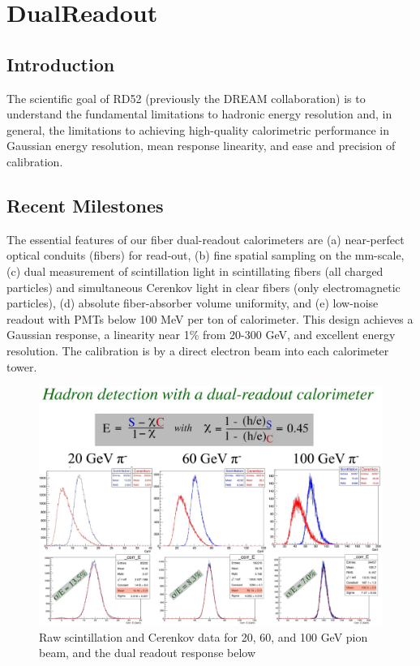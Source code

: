 \section{DualReadout}

\subsection{Introduction}
The scientific goal of RD52 (previously the DREAM collaboration) is to understand the fundamental limitations to hadronic energy resolution and, in general, the limitations to achieving high-quality calorimetric performance in Gaussian energy resolution, mean response linearity, and ease and precision of calibration.
\subsection{Recent Milestones}
The essential features of our fiber dual-readout calorimeters are (a) near-perfect optical conduits (fibers) for read-out, (b) fine spatial sampling on the mm-scale, (c) dual measurement of scintillation light in scintillating fibers (all charged particles) and simultaneous Cerenkov light in clear fibers (only electromagnetic particles), (d) absolute fiber-absorber volume uniformity, and (e) low-noise readout with PMTs below 100 MeV per ton of calorimeter. This design achieves a Gaussian response, a linearity near 1\% from 20-300 GeV, and excellent energy resolution. The calibration is by a direct electron beam into each calorimeter tower.
\begin{figure}
\centering
\includegraphics[width=.5\linewidth]{Calorimeter/DualReadout/Res-pion-20-60-100GeV.jpg}
\caption{Raw scintillation and Cerenkov data for 20, 60, and 100 GeV pion beam, and the dual readout response below}
\label{fig:DualReadout:PionResponse}
\end{figure}

